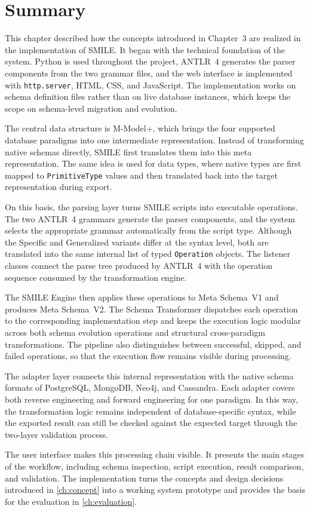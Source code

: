 \section{Summary}\label{sec:impl-summary}

This chapter described how the concepts introduced in Chapter~3 are realized in the implementation of SMILE. It began with the technical foundation of the system. Python is used throughout the project, ANTLR~4 generates the parser components from the two grammar files, and the web interface is implemented with \texttt{http.server}, HTML, CSS, and JavaScript. The implementation works on schema definition files rather than on live database instances, which keeps the scope on schema-level migration and evolution.

The central data structure is M-Model+, which brings the four supported database paradigms into one intermediate representation. Instead of transforming native schemas directly, SMILE first translates them into this meta representation. The same idea is used for data types, where native types are first mapped to \texttt{PrimitiveType} values and then translated back into the target representation during export.

On this basis, the parsing layer turns SMILE scripts into executable operations. The two ANTLR~4 grammars generate the parser components, and the system selects the appropriate grammar automatically from the script type. Although the Specific and Generalized variants differ at the syntax level, both are translated into the same internal list of typed \texttt{Operation} objects. The listener classes connect the parse tree produced by ANTLR~4 with the operation sequence consumed by the transformation engine.

The SMILE Engine then applies these operations to Meta Schema~V1 and produces Meta Schema~V2. The Schema Transformer dispatches each operation to the corresponding implementation step and keeps the execution logic modular across both schema evolution operations and structural cross-paradigm transformations. The pipeline also distinguishes between successful, skipped, and failed operations, so that the execution flow remains visible during processing.

The adapter layer connects this internal representation with the native schema formats of PostgreSQL, MongoDB, Neo4j, and Cassandra. Each adapter covers both reverse engineering and forward engineering for one paradigm. In this way, the transformation logic remains independent of database-specific syntax, while the exported result can still be checked against the expected target through the two-layer validation process.

The user interface makes this processing chain visible. It presents the main stages of the workflow, including schema inspection, script execution, result comparison, and validation. The implementation turns the concepts and design decisions introduced in \autoref{ch:concept} into a working system prototype and provides the basis for the evaluation in \autoref{ch:evaluation}.
